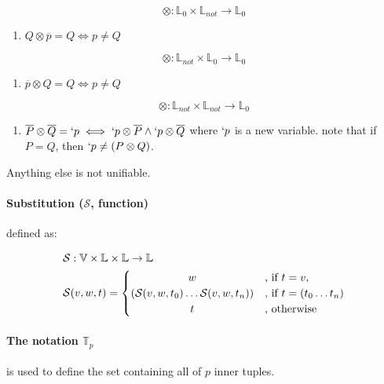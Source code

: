 \documentclass[11pt,a4paper]{report}
\newcommand{\var}[1]{`#1}
\newcommand{\unify}{\otimes}
\begin{document}
\[
    \unify: \mathbb{L}_{0} \times \mathbb{L}_{not} \rightarrow \mathbb{L}_{0}
\]

\begin{enumerate}
\item $Q \unify \overline{p} = Q \iff p \neq Q$
\end{enumerate}


\[
    \unify: \mathbb{L}_{not} \times \mathbb{L}_{0} \rightarrow \mathbb{L}_{0}
\]

\begin{enumerate}
\item $\overline{p} \unify Q = Q \iff p \neq Q$
\end{enumerate}

\[
    \unify: \mathbb{L}_{not} \times \mathbb{L}_{not} \rightarrow \mathbb{L}_{0}
\]

\begin{enumerate}
\item $\overline{P} \unify \overline{Q} = \var{p} \iff \var{p} \unify \overline{P} \wedge \var{p} \unify \overline{Q}$
    \subitem where $\var{p}$ is a new variable.
    \subitem note that if $P = Q$, then $\var{p} \neq (P \unify Q)$.
\end{enumerate}

Anything else is not unifiable.

\paragraph{Substitution ($\mathcal{S}$, function)} defined as:

\begin{align}
    \mathcal{S}&: \mathbb{V} \times \mathbb{L} \times \mathbb{L} \rightarrow \mathbb{L}\\
    \mathcal{S}&(v, w, t) =
    \begin{cases}
        \hfill w \hfill &\text{, if } t = v,\\
        \hfill (\mathcal{S}(v, w, t_{0}) \ldots \mathcal{S}(v, w, t_{n})) \hfill & \text{, if } t = (t_{0} \ldots t_{n})\\
        \hfill t \hfill & \text{, otherwise}
    \end{cases}
\end{align}


\paragraph{The notation $\mathbb{T}_{p}$} is used to define the set containing all of $p$ inner tuples.
\end{document}
